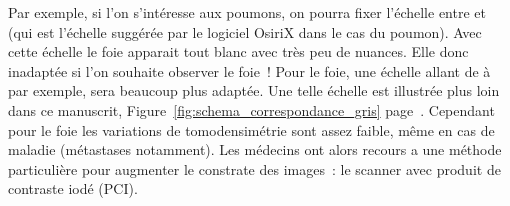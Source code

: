 \documentclass[main.tex]{subfiles}
\begin{document}
Par exemple, si l'on s'intéresse aux poumons, on pourra fixer l'échelle entre   et~ (qui est l'échelle suggérée par le logiciel OsiriX dans le cas du poumon). Avec cette échelle le foie apparait tout blanc avec très peu de nuances. Elle donc inadaptée si l'on souhaite observer le foie~! Pour le foie, une échelle allant de  à  par exemple, sera beaucoup plus adaptée. 
Une telle échelle est illustrée plus loin dans ce manuscrit, \cf Figure~\ref{fig:schema_correspondance_gris} page~\pageref{fig:schema_correspondance_gris}.
Cependant pour le foie les variations de tomodensimétrie sont assez faible, même en cas de maladie (métastases notamment). Les médecins ont alors recours a une méthode particulière pour augmenter le constrate des images~: le scanner avec produit de contraste iodé (PCI).
\end{document}
